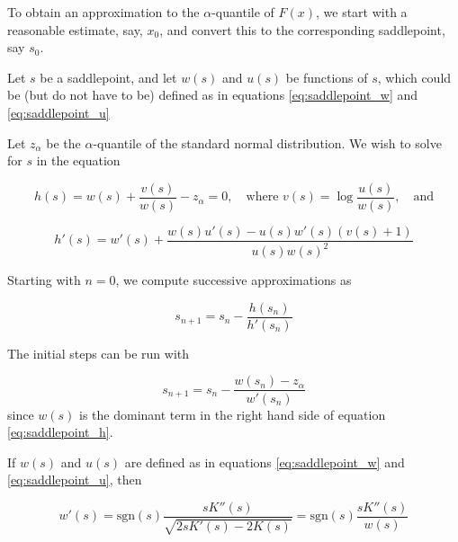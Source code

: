 To obtain an approximation to the $\alpha$-quantile of $F(x)$, we start with a reasonable estimate, say, $x_0$, and convert this to the corresponding saddlepoint, say $s_0$.

Let $s$ be a saddlepoint, and let $w(s)$ and $u(s)$ be functions of $s$, which could be (but do not have to be) defined as in equations \ref{eq:saddlepoint_w} and \ref{eq:saddlepoint_u}


Let $z_\alpha$ be the $\alpha$-quantile of the standard normal distribution. We wish to solve for $s$ in the equation




\begin{equation}
	h(s) = w(s) + \frac{v(s)}{w(s)}  - z_\alpha = 0, \quad \text{where } v(s)=\log \frac{u(s)}{w(s)},  \quad \text{and}   \label{eq:saddlepoint_h}
\end{equation}

\begin{equation}
	h'(s) = w'(s) + \frac{w(s) u'(s) - u(s) w'(s)\left(v(s)+1\right)}{u(s) w(s)^2}
\end{equation}


Starting with $n=0$, we compute successive approximations as

\begin{equation}
	s_{n+1} = s_n - \frac{h(s_n)}{h'(s_n)}
\end{equation}


The initial steps can be run with 

\begin{equation}
	s_{n+1} = s_n - \frac{w(s_n) - z_\alpha}{w'(s_n)}
\end{equation}
since $w(s)$ is the dominant term in the right hand side of equation \ref{eq:saddlepoint_h}.



If $w(s)$ and $u(s)$ are defined as in equations \ref{eq:saddlepoint_w} and \ref{eq:saddlepoint_u}, then

\begin{equation}
	w'(s) = \text{sgn}(s) \frac{s K''(s)}{\sqrt{2 s K'(s) - 2 K(s)}} = \text{sgn}(s) \frac{s K''(s)}{w(s)}
\end{equation}

